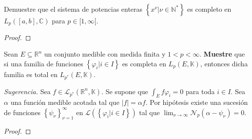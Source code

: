\documentclass[12pt]{report}
\theoremstyle{largebreak}
\newcommand\abs[1]{\ensuremath{\big|#1\big|}}
\newcommand{\N}[2]{\ensuremath{\mathcal{N}_{#1}\left(#2\right)}}
\begin{document}
    \begin{excer}
        Demuestre que el sistema de potencias enteras $\left\{x^\nu\Big|\nu\in\mathbb{N}^* \right\}$ es completo en $L_p([a,b],\mathbb{C})$ para $p\in[1,\infty[$.
    \end{excer}

    \begin{proof}
        
    \end{proof}

    \begin{excer}
        Sean $E\subseteq\mathbb{R}^n$ un conjunto medible con medida finita y $1<p<\infty$. \textbf{Muestre} que si una familia de funciones $\left\{\varphi_i\Big|i\in I \right\}$ es completa en $L_p(E,\mathbb{K})$, entonces dicha familia es total en $L_{p^*}(E,\mathbb{K})$.

        \textit{Sugerencia.} Sea $f\in\mathcal{L}_{p^*}(\mathbb{R}^n,\mathbb{K})$. Se supone que $\int_Ef\varphi_i=0$ para toda $i\in I$. Sea $\alpha$ una función medible acotada tal que $\abs{f}=\alpha f$. Por hipótesis existe una sucesión de funciones $\left\{\psi_\nu \right\}_{\nu=1}^\infty$ en $\mathcal{L}(\left\{\varphi_i\Big|i\in I \right\})$ tal que $\lim_{\nu\rightarrow\infty}\N{p}{\alpha-\psi_\nu}=0$.
    \end{excer}

    \begin{proof}
        
    \end{proof}
\end{document}
